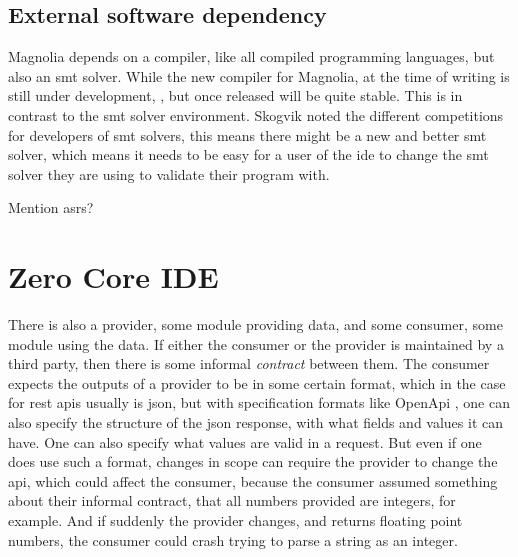 \subsection{External software dependency}

Magnolia depends on a compiler, like all compiled programming languages, but
also an \gls{smt} solver. While the new compiler for Magnolia, at the time of
writing is still under development, \cite{wiig}, but once released will be quite
stable. This is in contrast to the \gls{smt} solver environment. Skogvik
\cite{beateVerification} noted the different competitions for developers of
\gls{smt} solvers, this means there might be a new and better \gls{smt} solver,
which means it needs to be easy for a user of the \gls{ide} to change the
\gls{smt} solver they are using to validate their program with.

Mention \gls{asr}s?

\section{Zero Core IDE}


There is also a provider, some module providing data, and some consumer, some
module using the data. If either the consumer or the provider is maintained by a
third party, then there is some informal \textit{contract} between them. The
consumer expects the outputs of a provider to be in some certain format, which
in the case for \gls{rest} \gls{api}s usually is \gls{json}, but with
specification formats like OpenApi \cite{openApi}, one can also specify the
structure of the \gls{json} response, with what fields and values it can have.
One can also specify what values are valid in a request. But even if one does
use such a format, changes in scope can require the provider to change the
\gls{api}, which could affect the consumer, because the consumer assumed
something about their informal contract, that all numbers provided are
integers, for example. And if suddenly the provider changes, and returns
floating point numbers, the consumer could crash trying to parse a string as
an integer.

